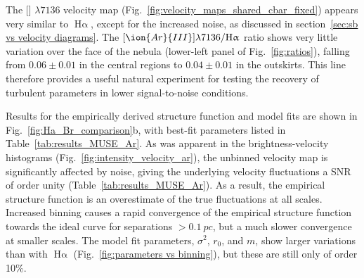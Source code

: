\documentclass[fleqn,usenatbib, useAMS, a4paper]{mnras}
\newcommand\ha{\ensuremath{\text{H}\upalpha}}
\newcommand\Wav[1]{\ensuremath{\lambda #1}}
\newcommand\ariii{[\ion{Ar}{III}] \Wav{7136}}
\newcommand\halpha{\ha}
\begin{document}
The \ariii{} velocity map (Fig.~\ref{fig:velocity_maps_shared_cbar_fixed})
appears very similar to \halpha{},
except for the increased noise,
as discussed in section~\ref{sec:sb vs velocity diagrams}.
The \(\ariii / \halpha\) ratio shows very little variation over the face of the nebula
(lower-left panel of Fig.~\ref{fig:ratios}),
falling from \(0.06 \pm 0.01\) in the central regions to \(0.04 \pm 0.01\) in the outskirts.
This line therefore provides a useful natural experiment for testing the recovery
of turbulent parameters in lower signal-to-noise conditions.

Results for the empirically derived structure function and model fits
are shown in Fig.~\ref{fig:Ha_Br_comparison}b, with best-fit parameters listed in Table~\ref{tab:results_MUSE_Ar}.
As was apparent in the brightness-velocity histograms (Fig.~\ref{fig:intensity_velocity_ar}),
the unbinned velocity map is significantly affected by noise,
giving the underlying velocity fluctuations a SNR of order unity (Table~\ref{tab:results_MUSE_Ar}).
As a result, the empirical structure function is an overestimate of the true fluctuations at all scales.
Increased binning causes a rapid convergence of the empirical structure function
towards the ideal curve for separations \( > \qty{0.1}{pc}\),
but a much slower convergence at smaller scales.
The model fit parameters,
\(\sigma^2\), \(r_0\), and \(m\),
show larger variations than with \halpha{} (Fig.~\ref{fig:parameters vs binning}),
but these are still only of order 10\%.




\end{document}
